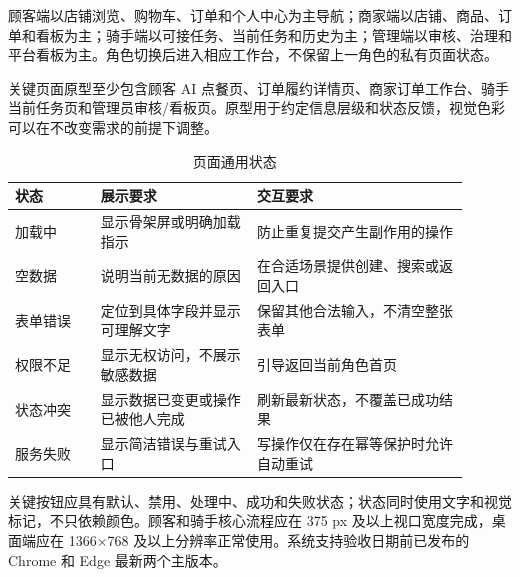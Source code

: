 顾客端以店铺浏览、购物车、订单和个人中心为主导航；商家端以店铺、商品、订单和看板为主；骑手端以可接任务、当前任务和历史为主；管理端以审核、治理和平台看板为主。角色切换后进入相应工作台，不保留上一角色的私有页面状态。


关键页面原型至少包含顾客 AI 点餐页、订单履约详情页、商家订单工作台、骑手当前任务页和管理员审核/看板页。原型用于约定信息层级和状态反馈，视觉色彩可以在不改变需求的前提下调整。


\begin{longtable}{|L{0.17\linewidth}|L{0.31\linewidth}|L{0.42\linewidth}|}
\caption{页面通用状态}\label{tab:ui-state}\\ \hline
\textbf{状态} & \textbf{展示要求} & \textbf{交互要求} \\ \hline
加载中 & 显示骨架屏或明确加载指示 & 防止重复提交产生副作用的操作 \\ \hline
空数据 & 说明当前无数据的原因 & 在合适场景提供创建、搜索或返回入口 \\ \hline
表单错误 & 定位到具体字段并显示可理解文字 & 保留其他合法输入，不清空整张表单 \\ \hline
权限不足 & 显示无权访问，不展示敏感数据 & 引导返回当前角色首页 \\ \hline
状态冲突 & 显示数据已变更或操作已被他人完成 & 刷新最新状态，不覆盖已成功结果 \\ \hline
服务失败 & 显示简洁错误与重试入口 & 写操作仅在存在幂等保护时允许自动重试 \\ \hline
\end{longtable}

关键按钮应具有默认、禁用、处理中、成功和失败状态；状态同时使用文字和视觉标记，不只依赖颜色。顾客和骑手核心流程应在 375 px 及以上视口宽度完成，桌面端应在 1366×768 及以上分辨率正常使用。系统支持验收日期前已发布的 Chrome 和 Edge 最新两个主版本。
